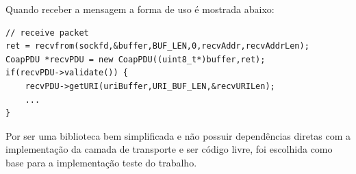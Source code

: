 Quando receber a mensagem a forma de uso \'e mostrada abaixo:
\begin{lstlisting}
// receive packet
ret = recvfrom(sockfd,&buffer,BUF_LEN,0,recvAddr,recvAddrLen);
CoapPDU *recvPDU = new CoapPDU((uint8_t*)buffer,ret);
if(recvPDU->validate()) {
    recvPDU->getURI(uriBuffer,URI_BUF_LEN,&recvURILen);
    ...
}
\end{lstlisting}

Por ser uma biblioteca bem simplificada e n\~ao possuir depend\^encias diretas com a implementa\c{c}\~ao da camada de transporte e ser c\'odigo livre, foi escolhida como base para a implementa\c{c}\~ao teste do trabalho.
